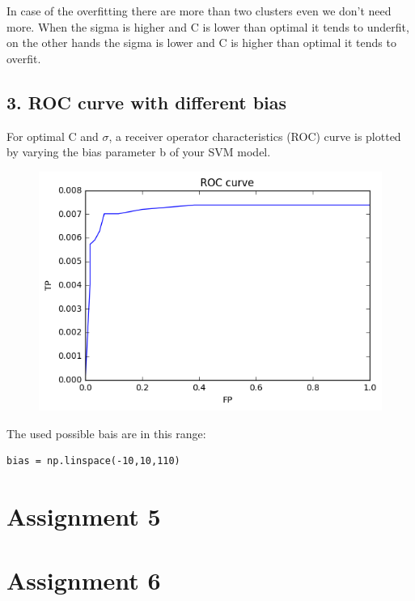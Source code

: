 \documentclass[a4paper,11pt]{article}
\begin{document}
In case of the overfitting there are more than two clusters even we don't need more.
When the sigma is higher and C is lower than optimal it tends to underfit, on the other hands the sigma is lower and C is higher than optimal it tends to overfit.

\subsection*{3. ROC curve with different bias}

For optimal C and $\sigma$, a receiver operator characteristics (ROC) curve is plotted by varying the bias
parameter b of your SVM model. 

\begin{figure}[htbp]
  \includegraphics[scale=0.5]{roc.png}
\end{figure}

The used possible bais are in this range:

\begin{verbatim}
bias = np.linspace(-10,10,110)
\end{verbatim}


\section*{Assignment 5}

\section*{Assignment 6}
\end{document}

